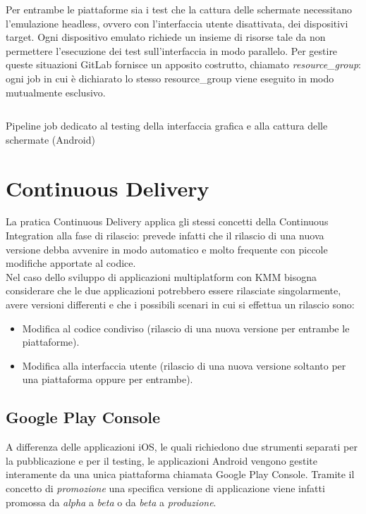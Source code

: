 Per entrambe le piattaforme sia i test che la cattura delle schermate necessitano l'emulazione headless, ovvero con l'interfaccia utente disattivata, dei dispositivi target. Ogni dispositivo emulato richiede un insieme di risorse tale da non permettere l'esecuzione dei test sull'interfaccia in modo parallelo. Per gestire queste situazioni GitLab fornisce un apposito costrutto, chiamato \textit{resource\_group}: ogni job in cui è dichiarato lo stesso resource\_group viene eseguito in modo mutualmente esclusivo.

\begin{listing}[H]
\inputminted{yaml}{code/4-screenshot-ui-android}
\caption{Pipeline job dedicato al testing della interfaccia grafica e alla cattura delle schermate (Android)}
\end{listing}

\section{Continuous Delivery}
La pratica Continuous Delivery applica gli stessi concetti della Continuous Integration alla fase di rilascio: prevede infatti che il rilascio di una nuova versione debba avvenire in modo automatico e molto frequente con piccole modifiche apportate al codice.\\
Nel caso dello sviluppo di applicazioni multiplatform con KMM bisogna considerare che le due applicazioni potrebbero essere rilasciate singolarmente, avere versioni differenti e che i possibili scenari in cui si effettua un rilascio sono:
\begin{itemize}
    \item Modifica al codice condiviso (rilascio di una nuova versione per entrambe le piattaforme).
    \item Modifica alla interfaccia utente (rilascio di una nuova versione soltanto per una piattaforma oppure per entrambe).
\end{itemize}

\subsection{Google Play Console}
A differenza delle applicazioni iOS, le quali richiedono due strumenti separati per la pubblicazione e per il testing, le applicazioni Android vengono gestite interamente da una unica piattaforma chiamata Google Play Console. Tramite il concetto di \textit{promozione} una specifica versione di applicazione viene infatti promossa da \textit{alpha} a \textit{beta} o da \textit{beta} a \textit{produzione}.


